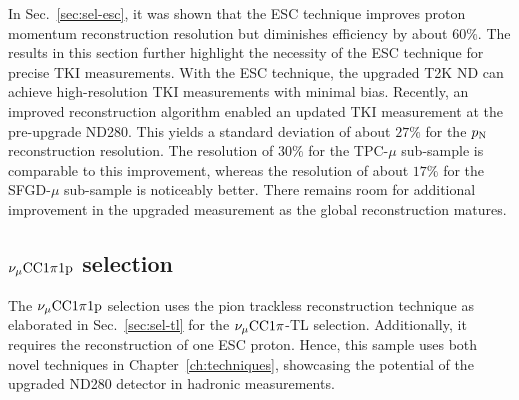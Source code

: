      In Sec.~\ref{sec:sel-esc}, it was shown that the ESC technique improves proton momentum reconstruction resolution but diminishes efficiency by about $60\%$.
     The results in this section further highlight the necessity of the ESC technique for precise TKI measurements.
     With the ESC technique, the upgraded T2K ND can achieve high-resolution TKI measurements with minimal bias.
     Recently, an improved reconstruction algorithm enabled an updated TKI measurement at the pre-upgrade ND280.
     This yields a standard deviation of about $27\%$ for the $p_\textrm{N}$ reconstruction resolution.
     The resolution of $30\%$ for the TPC-$\mu$ sub-sample is comparable to this improvement, whereas the resolution of about $17\%$ for the SFGD-$\mu$ sub-sample is noticeably better.
     There remains room for additional improvement in the upgraded measurement as the global reconstruction matures.

     \subsection{$\nu_{\mu}\textrm{CC}1\pi1\textrm{p}$ selection}
     \label{sec:mc-tki-1pi}
     The $\nu_{\mu}\textrm{CC}1\pi1\textrm{p}$ selection uses the pion trackless reconstruction technique as elaborated in Sec.~\ref{sec:sel-tl} for the $\nu_{\mu}\textrm{CC}1\pi$-TL selection.
     Additionally, it requires the reconstruction of one ESC proton.
     Hence, this sample uses both novel techniques in Chapter~\ref{ch:techniques}, showcasing the potential of the upgraded ND280 detector in hadronic measurements.

